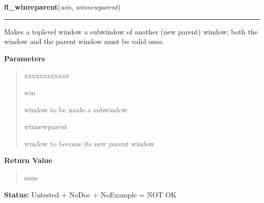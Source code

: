 \hspace{.8\funcindent}\begin{boxedminipage}{\funcwidth}

    \raggedright \textbf{fl\_winreparent}(\textit{win}, \textit{winnewparent})

    \vspace{-1.5ex}

    \rule{\textwidth}{0.5\fboxrule}
\setlength{\parskip}{2ex}
    Makes a toplevel window a subwindow of another (new parent) window; 
    both the window and the parent window must be valid ones.

\setlength{\parskip}{1ex}
      \textbf{Parameters}
      \vspace{-1ex}

      \begin{quote}
        \begin{Ventry}{xxxxxxxxxxxx}

          \item[win]

          window to be made a subwindow

          \item[winnewparent]

          window to become its new parent window

        \end{Ventry}

      \end{quote}

      \textbf{Return Value}
    \vspace{-1ex}

      \begin{quote}
      num

      \end{quote}

\textbf{Status:} Untested + NoDoc + NoExample = NOT OK



    \end{boxedminipage}

    \label{xformslib:library:fl_winfocus}

    \vspace{0.5ex}

